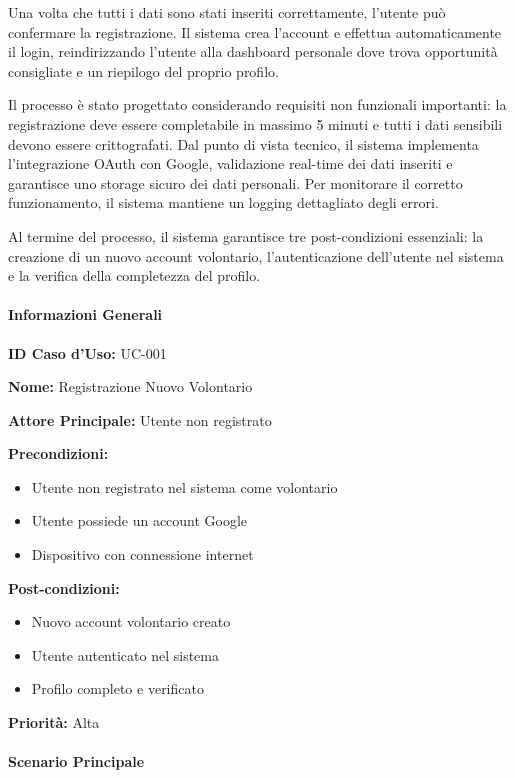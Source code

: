 Una volta che tutti i dati sono stati inseriti correttamente, l'utente può confermare la registrazione. Il sistema crea l'account e effettua automaticamente il login, reindirizzando l'utente alla dashboard personale dove trova opportunità consigliate e un riepilogo del proprio profilo.

Il processo è stato progettato considerando requisiti non funzionali importanti: la registrazione deve essere completabile in massimo 5 minuti e tutti i dati sensibili devono essere crittografati. Dal punto di vista tecnico, il sistema implementa l'integrazione OAuth con Google, validazione real-time dei dati inseriti e garantisce uno storage sicuro dei dati personali. Per monitorare il corretto funzionamento, il sistema mantiene un logging dettagliato degli errori.

Al termine del processo, il sistema garantisce tre post-condizioni essenziali: la creazione di un nuovo account volontario, l'autenticazione dell'utente nel sistema e la verifica della completezza del profilo.

\paragraph{Informazioni Generali}
\textbf{ID Caso d'Uso:} UC-001

\textbf{Nome:} Registrazione Nuovo Volontario

\textbf{Attore Principale:} Utente non registrato

\textbf{Precondizioni:}
\begin{itemize}
\item Utente non registrato nel sistema come volontario
\item Utente possiede un account Google
\item Dispositivo con connessione internet
\end{itemize}

\textbf{Post-condizioni:}
\begin{itemize}
\item Nuovo account volontario creato
\item Utente autenticato nel sistema
\item Profilo completo e verificato
\end{itemize}

\textbf{Priorità:} Alta

\paragraph{Scenario Principale}

